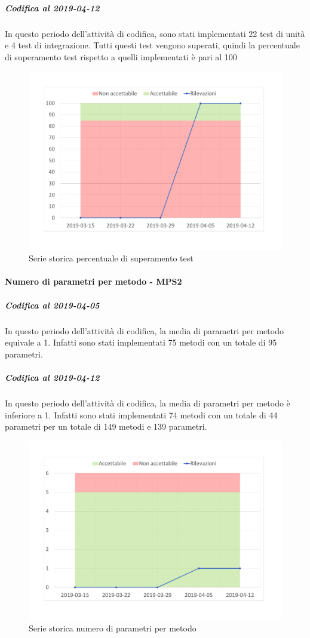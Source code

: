 \subparagraph{Codifica al 2019-04-12}
In questo periodo dell'attività di codifica, sono stati implementati 22 test di unità e 4 test di integrazione. Tutti questi test vengono superati, quindi la percentuale di superamento test rispetto a quelli implementati è pari al 100%

\begin{figure}[H]
	\centering
	\includegraphics[scale=0.6]{images/resoconto/MPS1Chart.pdf}
	\caption{Serie storica percentuale di superamento test}	
\end{figure}

\paragraph{Numero di parametri per metodo - MPS2}
\subparagraph{Codifica al 2019-04-05}
In questo periodo dell'attività di codifica, la media di parametri per metodo equivale a 1. Infatti sono stati implementati 75 metodi con un totale di 95 parametri.

\subparagraph{Codifica al 2019-04-12}
In questo periodo dell'attività di codifica, la media di parametri per metodo è inferiore a 1. Infatti sono stati implementati 74 metodi con un totale di 44 parametri per un totale di 149 metodi e 139 parametri.
\begin{figure}[H]
	\centering
	\includegraphics[scale=0.6]{images/resoconto/MPS2Chart.pdf}
	\caption{Serie storica numero di parametri per metodo}	
\end{figure}

